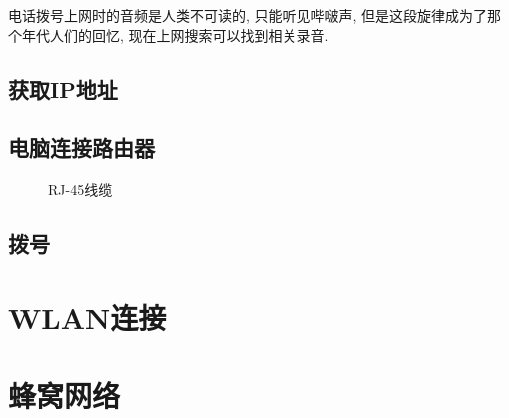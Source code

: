 电话拨号上网时的音频是人类不可读的, 只能听见哔啵声, 但是这段旋律成为了那个年代人们的回忆, 现在上网搜索可以找到相关录音.

\subsection{获取IP地址}


\subsection{电脑连接路由器}

\begin{figure}[htbp]
    \centering
    
    \caption{RJ-45线缆
    \cite{EthernetPlugGrey}
    }
\end{figure}

\subsection{拨号}


\section{WLAN连接}\label{sec:WLAN连接}


\section{蜂窝网络}


\endinput
